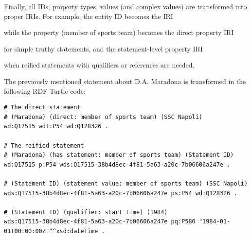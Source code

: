 \noindent
Finally, all IDs, property types, values (and complex values) are transformed into proper IRIs. For example, the entity ID  becomes the IRI 
\begin{center}
\end{center}
while the property  (member of sports team) becomes the direct property IRI 
\begin{center}
\end{center}
for simple truthy statements, and the statement-level property IRI 
\begin{center}
\end{center}
when reified statements with qualifiers or references are needed.

\begin{example}{}
    The previously mentioned statement about D.A. Maradona is transformed in the following RDF Turtle code:
    \begin{lstlisting}
# The direct statement
# (Maradona) (direct: member of sports team) (SSC Napoli)
wd:Q17515 wdt:P54 wd:Q128326 . 

# The reified statement
# (Maradona) (has statement: member of sports team) (Statement ID)
wd:Q17515 p:P54 wds:Q17515-38b4d8ec-4f81-5a63-a20c-7b06606a247e .

# (Statement ID) (statement value: member of sports team) (SSC Napoli)
wds:Q17515-38b4d8ec-4f81-5a63-a20c-7b06606a247e ps:P54 wd:Q128326 .

# (Statement ID) (qualifier: start time) (1984)
wds:Q17515-38b4d8ec-4f81-5a63-a20c-7b06606a247e pq:P580 "1984-01-01T00:00:00Z"^^xsd:dateTime .
    \end{lstlisting}
\end{example}

